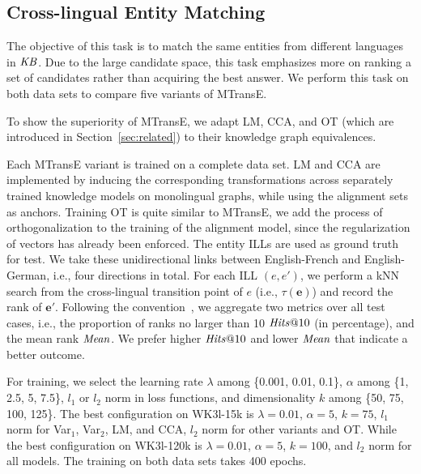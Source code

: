 \documentclass{article}
\def\inv{\vspace{-0.1cm}}
\begin{document}
\inv
\subsection{Cross-lingual Entity Matching} \label{sec:entity_matching}
The objective of this task is to match the same entities from different languages in $\mathit{KB}$. Due to the large candidate \mbox{space}, this task emphasizes more on ranking a set of candidates rather than acquiring the best answer. We perform this task on both data sets to compare five variants of MTransE.\par

To show the superiority of MTransE, we adapt LM, CCA, and OT (which are introduced in Section~\ref{sec:related}) to their knowledge graph equivalences.

 Each MTransE variant is trained on a complete data set. LM and CCA are implemented by inducing the corresponding transformations across separately trained knowledge models on monolingual graphs, while using the alignment sets as anchors.
Training OT is quite similar to MTransE, we add the process of orthogonalization to the training of the alignment model, since the regularization of vectors has already been enforced.
The entity ILLs are used as ground truth for test. We take these unidirectional links between English-French and English-German, i.e., four directions in total. For each ILL $(e, e')$, we perform a kNN search from the cross-lingual transition point of $e$ (i.e., $\tau(\mathbf{e})$)
and record the rank of $\mathbf{e'}$. Following the convention~\cite{xing2015normalized,jia2016locally},
we aggregate two metrics over all test cases, i.e., the proportion of ranks no larger than 10 $\mathit{Hits}\mbox{@}10$ (in percentage), and the mean rank $\mathit{Mean}$. We prefer higher $\mathit{Hits}\mbox{@}10$ and lower $\mathit{Mean}$ that indicate a better outcome. \par

For training,  we select the learning rate $\lambda$ among \{0.001, 0.01, 0.1\}, $\alpha$ among \{1, 2.5, 5, 7.5\}, $l_1$ or $l_2$ norm in loss functions, and dimensionality $k$ among \{50, 75, 100, 125\}. The best configuration on WK3l-15k is $\lambda=0.01$, $\alpha=5$, $k=75$, $l_1$ norm for Var$_1$, Var$_2$, LM, and CCA, $l_2$ norm for other variants and OT. While the best configuration on WK3l-120k is $\lambda=0.01$, $\alpha=5$, $k=100$, and $l_2$ norm for all models. The training on both data sets takes 400 epochs. \par
\end{document}
